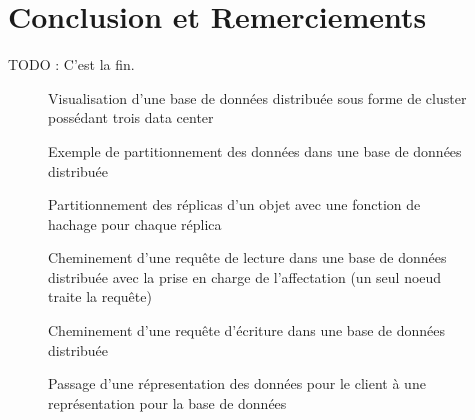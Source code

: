 \documentclass[12pt]{article}
\begin{document}
\paragraph{}

\section{Conclusion et Remerciements}

TODO : C'est la fin.





\begin{figure}[H]
	\centering
		
	\caption{Visualisation d'une base de données distribuée sous forme de cluster possédant trois data center\label{fig:distributed_database}}
\end{figure}

\begin{figure}[H]
	\centering
		
	\caption{Exemple de partitionnement des données dans une base de données distribuée\label{fig:partitionning}}
\end{figure}

\begin{figure}[H]
	\centering
		
	\caption{Partitionnement des réplicas d'un objet avec une fonction de hachage pour chaque réplica\label{fig:multi_hash_partitionning}}
\end{figure}

\begin{figure}[H]
	\centering
		
	\caption{Cheminement d'une requête de lecture dans une base de données distribuée avec la prise en charge de l'affectation (un seul noeud traite la requête)\label{fig:request}}
\end{figure}

\begin{figure}[H]
	\centering
		
	\caption{Cheminement d'une requête d'écriture dans une base de données distribuée\label{fig:write_request}}
\end{figure}

\begin{figure}[H]
	\centering
		
	\caption{Passage d'une répresentation des données pour le client à une représentation pour la base de données\label{fig:token}}
\end{figure}
\end{document}
